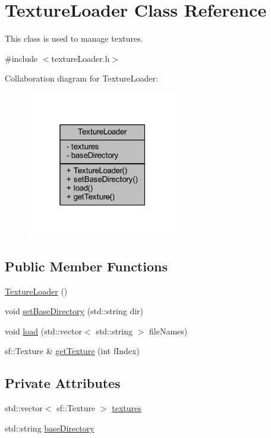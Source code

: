\hypertarget{class_texture_loader}{}\section{Texture\+Loader Class Reference}
\label{class_texture_loader}


This class is used to manage textures.  




{\ttfamily \#include $<$texture\+Loader.\+h$>$}



Collaboration diagram for Texture\+Loader\+:\nopagebreak
\begin{figure}[H]
\begin{center}
\leavevmode
\includegraphics[width=187pt]{class_texture_loader__coll__graph}
\end{center}
\end{figure}
\subsection*{Public Member Functions}
\begin{DoxyCompactItemize}
\item 
\hyperlink{class_texture_loader_aafa6ca3bdbee3874a73aafae39d5c804}{Texture\+Loader} ()
\item 
void \hyperlink{class_texture_loader_a08f49a4b5cd9e0d5f84064de749b3eaf}{set\+Base\+Directory} (std\+::string dir)
\item 
void \hyperlink{class_texture_loader_a44ce52ccffb88baa49ba8128cc792ffc}{load} (std\+::vector$<$ std\+::string $>$ file\+Names)
\item 
sf\+::\+Texture \& \hyperlink{class_texture_loader_abfcc36c51b8d6a493040e01ed84f6bfc}{get\+Texture} (int f\+Index)
\end{DoxyCompactItemize}
\subsection*{Private Attributes}
\begin{DoxyCompactItemize}
\item 
std\+::vector$<$ sf\+::\+Texture $>$ \hyperlink{class_texture_loader_ad4e7dba3bb89484d7c92b702423cfc77}{textures}
\item 
std\+::string \hyperlink{class_texture_loader_acd647e9e5e5ca9b1ba8b3e6ef0aa9d84}{base\+Directory}
\end{DoxyCompactItemize}


